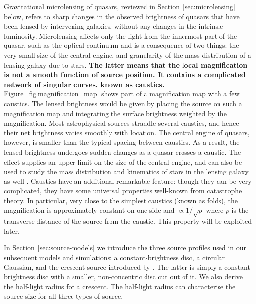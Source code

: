 Gravitational microlensing of quasars, reviewed in
Section~\ref{sec:microlensing} below, refers to sharp changes in the
observed brightness of quasars that have been lensed by intervening
galaxies, without any changes in the intrinsic luminosity.
Microlensing affects only the light from the innermost part of the
quasar, such as the optical continuum
\citep[e.g.,][]{2012A&A...544A..62S} and is a consequence of two
things: the very small size of the central engine, and granularity of
the mass distribution of a lensing galaxy due to stars.  \textbf{The latter
means that the local magnification is not a smooth function of source 
position. It contains a complicated network of singular curves, known as caustics.}
Figure~\ref{fig:magnification_map} shows part of a magnification map
with a few caustics.  The lensed brightness would be given by placing
the source on such a magnification map and integrating the surface
brightness weighted by the magnification.  Most astrophysical sources
straddle several caustics, and hence their net brightness varies
smoothly with location.  The central engine of quasars, however, is
smaller than the typical spacing between caustics.  As a result, the
lensed brightness undergoes sudden changes as a quasar crosses a
caustic.  The effect supplies an upper limit on the size of the
central engine, and can also be used to study the mass distribution
and kinematics of stars in the lensing galaxy as well
\citep[e.g.,][]{2012ApJ...744..111P}.  Caustics have an additional
remarkable feature: though they can be very complicated, they have
some universal properties well-known from catastrophe theory.  In
particular, very close to the simplest caustics (known as folds), the
magnification is approximately constant on one side and
$\propto1/\sqrt p$ where $p$ is the transverse distance of the source
from the caustic.  This property will be exploited later.

In Section~\ref{sec:source-models} we introduce the three source
profiles used in our subsequent models and simulations: a
constant-brightness disc, a circular Gaussian, and the crescent source
introduced by \citep{2013MNRAS.434..765K}.  The latter is simply a
constant-brightness disc with a smaller, non-concentric disc cut out
of it.  We also derive the half-light radius for a crescent.  The
half-light radius can characterise the source size for all three types
of source.

